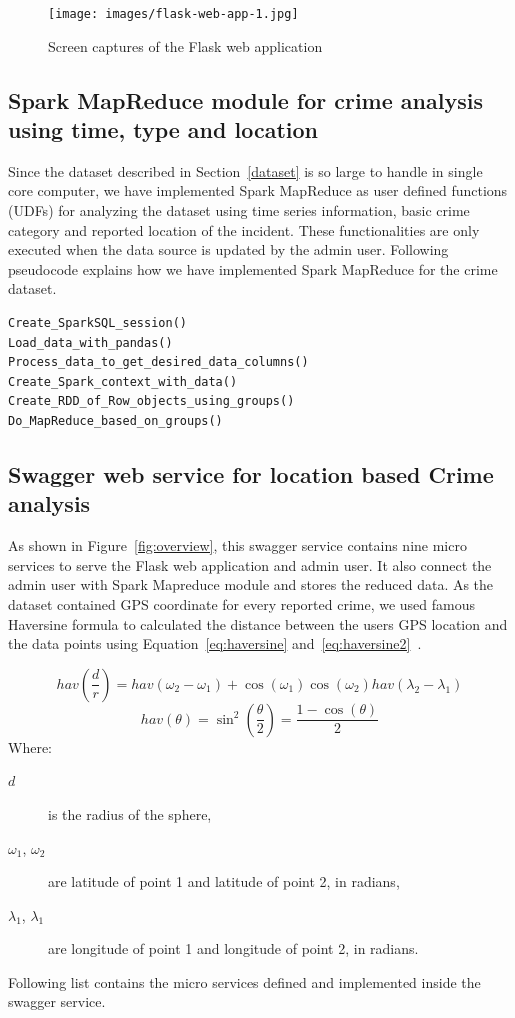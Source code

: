 \begin{figure}[htb]
	\centering\texttt{[image: images/flask-web-app-1.jpg]}
	\caption{Screen captures of the Flask web
        application}\label{fig:screencapture}
\end{figure}

\subsection{Spark MapReduce module for crime analysis using time,
type and location}\label{sparkModule}
Since the dataset described in Section~\ref{dataset} is so large to
handle in single core computer, we have implemented Spark MapReduce as
user defined functions (UDFs) for analyzing the dataset using time
series information, basic crime category and reported location of the
incident. These functionalities are only executed when the data source
is updated by the admin user. Following pseudocode explains how we
have implemented Spark MapReduce for the crime dataset.

\begin{verbatim}
Create_SparkSQL_session()
Load_data_with_pandas()
Process_data_to_get_desired_data_columns()
Create_Spark_context_with_data()
Create_RDD_of_Row_objects_using_groups()
Do_MapReduce_based_on_groups()
\end{verbatim}

\subsection{Swagger web service for location based Crime
analysis}\label{swaggerService}
As shown in Figure~\ref{fig:overview}, this swagger service contains
nine micro services to serve the Flask web application and admin
user. It also connect the admin user with Spark Mapreduce module and
stores the reduced data. As the dataset contained GPS coordinate for
every reported crime, we used famous Haversine formula to calculated
the distance between the users GPS location and the data points using
Equation~\ref{eq:haversine}
and~\ref{eq:haversine2}~\cite{hid-sp18-409-siahaan2017haversine}.

\begin{equation}\label{eq:haversine}
hav(\frac{d}{r}) = hav(\omega_2 - \omega_1)
+ \cos(\omega_1)\cos(\omega_2)hav(\lambda_2 - \lambda_1)
\end{equation}
\begin{equation}\label{eq:haversine2}
hav(\theta) = \sin^2(\frac{\theta}{2}) = \frac{1-\cos(\theta)}{2}
\end{equation}
Where:
\begin{description}
\item[$d$] is the radius of the sphere,
\item[$\omega_1$, $\omega_2$] are latitude of point 1 and latitude
of point 2, in radians,
\item[$\lambda_1$, $\lambda_1$] are longitude of point 1 and longitude
of point 2, in radians.
\end{description}
Following list contains the micro services defined and implemented inside
the swagger service.

